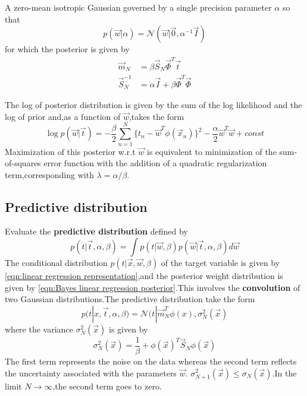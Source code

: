 A zero-mean isotropic Gaussian governed by a single precision parameter $\alpha$ so that
\begin{equation}
p(\vec{w}|\alpha) = \mathcal{N}(\vec{w}|\vec{0},\alpha^{-1}\vec{I})
\end{equation}
for which the posterior is given by
\begin{align}
\vec{m}_N &=\beta\vec{S}_N\vec{\Phi}^T\vec{t} \\
\vec{S}_N^{-1}&=\alpha\vec{I}+\beta\vec{\Phi}^T\vec{\Phi}
\end{align}

The log of posterior distribution is given by the sum of the log likelihood and the log of prior and,as a function of $\vec{w}$,takes the form
\begin{equation}
\log p(\vec{w}|\vec{t}) = 
-\dfrac{\beta}{2}\sum_{n=1}^{N}\{t_n-\vec{w}^T\phi(\vec{x}_n) \}^2-\dfrac{\alpha}{2}\vec{w}^T\vec{w}+const
\end{equation}
Maximization of this posterior w.r.t $\vec{w}$ is equivalent to minimization of the sum-of-squares error function with the addition of a quadratic regularization term,corresponding with $\lambda=\alpha/\beta$.



\subsection{Predictive distribution}
Evaluate the \textbf{predictive distribution} defined by
\begin{equation}
p(t|\vec{t},\alpha,\beta) = \int p(t|\vec{w},\beta)p(\vec{w}|\vec{t},\alpha,\beta)d\vec{w}
\end{equation}
The conditional distribution $p(t|\vec{x},\vec{w},\beta)$ of the target variable is given by \ref{eqn:linear regression representation},and the posterior weight distribution is given by \ref{eqn:Bayes linear regression posterior}.This involves the \textbf{convolution} of two Gaussian distributions.The predictive distribution take the form
\begin{equation}
p(t|x,\vec{t},\alpha,\beta) = \mathcal{N}(t|\vec{m}_N^T\phi(x),\sigma_N^2(\vec{x})
\end{equation}
where the variance $\sigma_N^2(\vec{x})$ is given by
\begin{equation}
\sigma_N^2(\vec{x})=\dfrac{1}{\beta}+\phi(\vec{x})^T\vec{S}_N\phi(\vec{x})
\end{equation}
The first term represents the noise on the data whereas the second term reflects the uncertainty associated with the parameters $\vec{w}$.
$\sigma_{N+1}^2(\vec{x})\leq \sigma_N(\vec{x})$.In the limit $N\rightarrow \infty$,the second term goes to zero.

